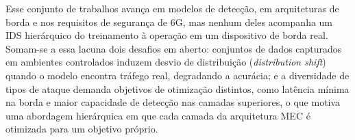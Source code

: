 \documentclass[12pt,a4paper]{article}
\begin{document}
\begin{table}[ht]
\centering
\caption{Posicionamento do trabalho frente à literatura segundo cinco dimensões de avaliação.}
\label{tab:related}
\setlength{\tabcolsep}{4pt}
\end{table}

Esse conjunto de trabalhos avança em modelos de detecção, em arquiteturas de
borda e nos requisitos de segurança de 6G, mas nenhum deles acompanha um IDS
hierárquico do treinamento à operação em um dispositivo de borda real. Somam-se
a essa lacuna dois desafios em aberto: conjuntos de dados capturados em
ambientes controlados induzem desvio de distribuição (\textit{distribution
shift}) quando o modelo encontra tráfego real, degradando a acurácia; e a
diversidade de tipos de ataque demanda objetivos de otimização distintos, como
latência mínima na borda e maior capacidade de detecção nas camadas
superiores, o que motiva uma abordagem hierárquica em que cada camada da
arquitetura MEC é otimizada para um objetivo próprio.
\end{document}
